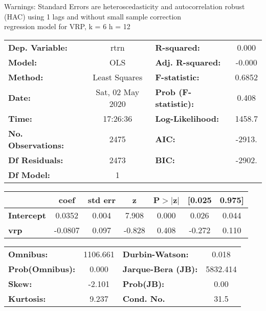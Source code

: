 Warnings: \newline
 [1] Standard Errors are heteroscedasticity and autocorrelation robust (HAC) using 1 lags and without small sample correction\\ 

regression model for VRP, k = 6 h = 12\begin{center}
\begin{tabular}{lclc}
\toprule
\textbf{Dep. Variable:}    &       rtrn       & \textbf{  R-squared:         } &     0.000   \\
\textbf{Model:}            &       OLS        & \textbf{  Adj. R-squared:    } &    -0.000   \\
\textbf{Method:}           &  Least Squares   & \textbf{  F-statistic:       } &    0.6852   \\
\textbf{Date:}             & Sat, 02 May 2020 & \textbf{  Prob (F-statistic):} &    0.408    \\
\textbf{Time:}             &     17:26:36     & \textbf{  Log-Likelihood:    } &    1458.7   \\
\textbf{No. Observations:} &        2475      & \textbf{  AIC:               } &    -2913.   \\
\textbf{Df Residuals:}     &        2473      & \textbf{  BIC:               } &    -2902.   \\
\textbf{Df Model:}         &           1      & \textbf{                     } &             \\
\bottomrule
\end{tabular}
\begin{tabular}{lcccccc}
                   & \textbf{coef} & \textbf{std err} & \textbf{z} & \textbf{P$> |$z$|$} & \textbf{[0.025} & \textbf{0.975]}  \\
\midrule
\textbf{Intercept} &       0.0352  &        0.004     &     7.908  &         0.000        &        0.026    &        0.044     \\
\textbf{vrp}       &      -0.0807  &        0.097     &    -0.828  &         0.408        &       -0.272    &        0.110     \\
\bottomrule
\end{tabular}
\begin{tabular}{lclc}
\textbf{Omnibus:}       & 1106.661 & \textbf{  Durbin-Watson:     } &    0.018  \\
\textbf{Prob(Omnibus):} &   0.000  & \textbf{  Jarque-Bera (JB):  } & 5832.414  \\
\textbf{Skew:}          &  -2.101  & \textbf{  Prob(JB):          } &     0.00  \\
\textbf{Kurtosis:}      &   9.237  & \textbf{  Cond. No.          } &     31.5  \\
\bottomrule
\end{tabular}
\end{center}

